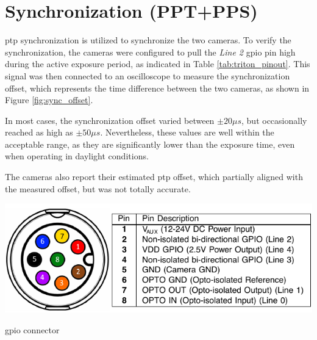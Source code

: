 \section{Synchronization (PPT+PPS)}
\gls{ptp} synchronization is utilized to synchronize the two cameras.
To verify the synchronization, the cameras were configured to pull the \textit{Line 2} \gls{gpio} pin high during the active exposure period, as indicated in Table \ref{tab:triton_pinout}.
This signal was then connected to an oscilloscope to measure the synchronization offset, which represents the time difference between the two cameras, as shown in Figure \ref{fig:sync_offset}.

In most cases, the synchronization offset varied between $\pm20\mu s$, but occasionally reached as high as $\pm50\mu s$.
Nevertheless, these values are well within the acceptable range, as they are significantly lower than the exposure time, even when operating in daylight conditions.

The cameras also report their estimated \gls{ptp} offset, which partially aligned with the measured offset, but was not totally accurate.

\begin{table}
    \centering
    \includegraphics[width=\textwidth]{figures/triton_pinout.pdf}
    \caption{\cam \gls{gpio} connector \cite{lucidvisionlabsTritonMPPolarized2020}}
    \label{tab:triton_pinout}
\end{table}


